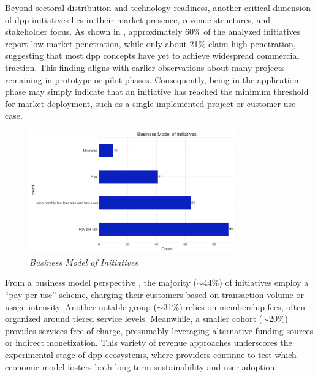 Beyond sectoral distribution and technology readiness, another critical dimension of \ac{dpp} initiatives lies in their market presence, revenue structures, and stakeholder focus. As shown in , approximately 60\% of the analyzed initiatives report low market penetration, while only about 21\% claim high penetration, suggesting that most \ac{dpp} concepts have yet to achieve widespread commercial traction. This finding aligns with earlier observations about many projects remaining in prototype or pilot phases. Consequently, being in the application phase may simply indicate that an initiative has reached the minimum threshold for market deployment, such as a single implemented project or customer use case.

\begin{figure}[H]
  \centering
  \includegraphics[width=0.8\textwidth]{figures/initiatives_buesiness_model.png}
  \caption{%
    \textit{Business Model of Initiatives} 
  }
  \label{fig:initiatives_buesiness_model}
\end{figure}

From a business model perspective , the majority ($\sim$44\%) of initiatives employ a “pay per use” scheme, charging their customers based on transaction volume or usage intensity. Another notable group ($\sim$31\%) relies on membership fees, often organized around tiered service levels. Meanwhile, a smaller cohort ($\sim$20\%) provides services free of charge, presumably leveraging alternative funding sources or indirect monetization. This variety of revenue approaches underscores the experimental stage of \ac{dpp} ecosystems, where providers continue to test which economic model fosters both long-term sustainability and user adoption.

